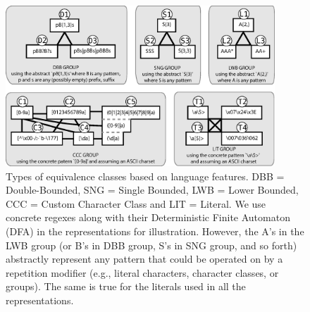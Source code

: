\begin{figure}[tb]
\centering
\includegraphics[width=0.90\textwidth]{illustrations/refactoringTree.eps}
\caption{Types of equivalence classes based on language features. DBB = Double-Bounded, SNG = Single Bounded, LWB = Lower Bounded, CCC = Custom Character Class and LIT = Literal. We use concrete regexes along with their Deterministic Finite Automaton (DFA) in the representations for illustration. However, the A's in the LWB group (or B's in DBB group, S's in SNG group, and so forth) abstractly represent any pattern that could be operated on by a repetition modifier (e.g., literal characters, character classes, or groups). The same is true for the literals used in all the representations. }
\vspace{-6pt}
\vspace{-3pt}
\label{fig:refactoringTree}
\end{figure}


